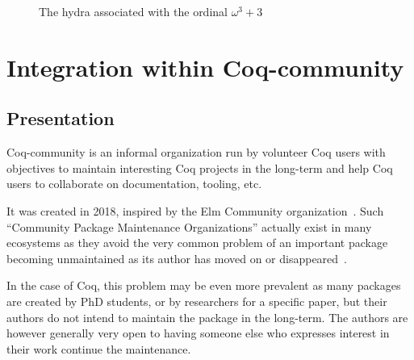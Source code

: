 \documentclass{easychair}
\newcommand{\TODO}[2][]{[\textcolor{red}{TODO (#1):} \emph{#2}]}
\newcommand{\coq}{Coq\xspace}
\newcommand{\community}{Coq-community\xspace}
\begin{document}
\begin{figure}[h]
  \centering

  \caption{The hydra associated with the ordinal $\omega^3+3$}
  \label{fig:start}
\end{figure}




\label{sect:not-pr}





\section{Integration within \community}

\subsection{Presentation}

\community is an informal organization run by volunteer Coq users with objectives to maintain interesting Coq projects in the long-term and help Coq users to collaborate on documentation, tooling, etc.

It was created in 2018, inspired by the {Elm Community} organization~\cite{zimmermann:tel-02451322}.
%
Such ``Community Package Maintenance Organizations'' actually exist in many ecosystems as they avoid the very common problem of an important package becoming unmaintained as its author has moved on or disappeared~\cite{zimmermann2021grounded}.

In the case of \coq, this problem may be even more prevalent as many packages are created by PhD students, or by researchers for a specific paper, but their authors do not intend to maintain the package in the long-term.
%
The authors are however generally very open to having someone else who expresses interest in their work continue the maintenance.
%
\end{document}
